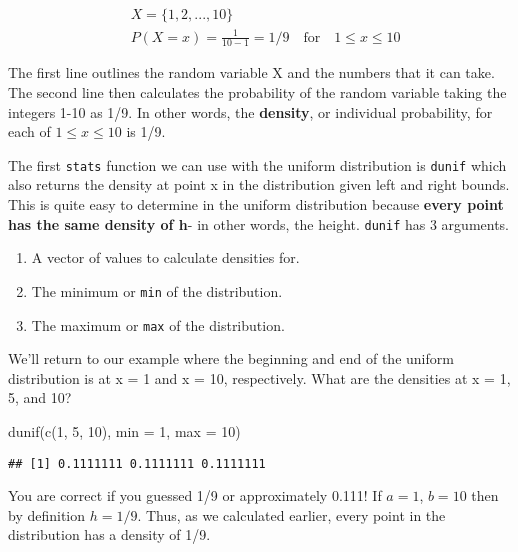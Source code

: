 \documentclass[
]{article}
\newenvironment{Shaded}{\begin{snugshade}}{\end{snugshade}}
\newcommand{\AttributeTok}[1]{\textcolor[rgb]{0.77,0.63,0.00}{#1}}
\newcommand{\DecValTok}[1]{\textcolor[rgb]{0.00,0.00,0.81}{#1}}
\newcommand{\FunctionTok}[1]{\textcolor[rgb]{0.00,0.00,0.00}{#1}}
\newcommand{\NormalTok}[1]{#1}
\begin{document}
\[
\begin{split}
&X=\{1,2,...,10\}\\&P(X=x)=\frac{1}{10-1}=1/9\quad\textrm{for}\quad1\leq x\leq 10 
\end{split}
\]

The first line outlines the random variable X and the numbers that it can take. The second line then calculates the probability of the random variable taking the integers 1-10 as 1/9. In other words, the \textbf{density}, or individual probability, for each of \(1\leq x\leq 10\) is 1/9.

The first \texttt{stats} function we can use with the uniform distribution is \texttt{dunif} which also returns the density at point x in the distribution given left and right bounds. This is quite easy to determine in the uniform distribution because \textbf{every point has the same density of h}- in other words, the height. \texttt{dunif} has 3 arguments.

\begin{enumerate}
\def\labelenumi{\arabic{enumi}.}
\item
  A vector of values to calculate densities for.
\item
  The minimum or \texttt{min} of the distribution.
\item
  The maximum or \texttt{max} of the distribution.
\end{enumerate}

We'll return to our example where the beginning and end of the uniform distribution is at x = 1 and x = 10, respectively. What are the densities at x = 1, 5, and 10?

\begin{Shaded}
\begin{Highlighting}[]
\FunctionTok{dunif}\NormalTok{(}\FunctionTok{c}\NormalTok{(}\DecValTok{1}\NormalTok{, }\DecValTok{5}\NormalTok{, }\DecValTok{10}\NormalTok{), }\AttributeTok{min =} \DecValTok{1}\NormalTok{, }\AttributeTok{max =} \DecValTok{10}\NormalTok{)}
\end{Highlighting}
\end{Shaded}

\begin{verbatim}
## [1] 0.1111111 0.1111111 0.1111111
\end{verbatim}

You are correct if you guessed 1/9 or approximately 0.111! If \(a = 1\), \(b = 10\) then by definition \(h = 1/9\). Thus, as we calculated earlier, every point in the distribution has a density of 1/9.
\end{document}

